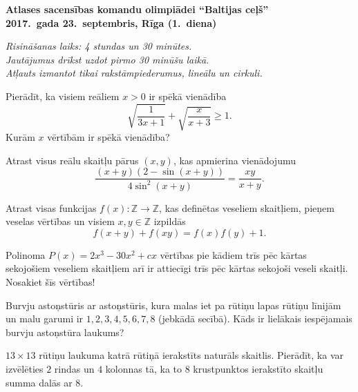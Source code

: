 \documentclass[11pt]{article}
\begin{document}
\begin{center}
{\Large \bf Atlases sacensības komandu olimpiādei ``Baltijas ceļš''}\\
{\bf 2017.\ gada 23.\ septembris, Rīga (1.\ diena)}
\end{center}

{\footnotesize \em 
Risināšanas laiks: 4 stundas un 30 minūtes.\\
Jautājumus drīkst uzdot pirmo 30 minūšu laikā.\\ 
Atļauts izmantot tikai rakstāmpiederumus, lineālu un cirkuli.
}

\begin{problem}[BW.TST.2017.1]
Pierādīt, ka visiem reāliem $x>0$ ir spēkā vienādība
\[ \sqrt{\frac{1}{3x+1}} + \sqrt{\frac{x}{x+3}} \geq 1. \]
Kurām $x$ vērtībām ir spēkā vienādība?
\end{problem}

\begin{problem}[BW.TST.2017.2]
Atrast visus reālu skaitļu pārus $(x,y)$, kas apmierina vienādojumu
\[ \frac{(x+y)(2 - \sin(x+y))}{4 \sin^2(x+y)} = \frac{xy}{x+y}. \]
\end{problem}

\begin{problem}[BW.TST.2017.3]
Atrast visas funkcijas $f(x): \mathbb{Z} \rightarrow \mathbb{Z}$, kas
definētas veseliem skaitļiem, pieņem veselas vērtības un visiem 
$x,y \in \mathbb{Z}$ izpildās
\[ f(x+y) + f(xy) = f(x)f(y) + 1. \]
\end{problem}

\begin{problem}[BW.TST.2017.4]
Polinoma $P(x) = 2x^3 - 30x^2 + cx$ vērtības pie kādiem trīs pēc kārtas 
sekojošiem veseliem skaitļiem arī ir attiecīgi trīs pēc kārtas sekojoši veseli skaitļi. 
Nosakiet šīs vērtības!
\end{problem}


\begin{problem}[BW.TST.2017.5]
Burvju astoņstūris ar astoņstūris, kura malas iet pa rūtiņu lapas rūtiņu 
līnijām un malu garumi ir $1,2,3,4,5,6,7,8$ (jebkādā secībā). 
Kāds ir lielākais iespējamais burvju astoņstūra laukums?
\end{problem}

\begin{problem}[BW.TST.2017.6]
$13 \times 13$ rūtiņu laukuma katrā rūtiņā ierakstīts naturāls skaitlis. 
Pierādīt, ka var izvēlēties $2$ rindas un $4$ kolonnas tā, ka to $8$ krustpunktos 
ierakstīto skaitļu summa dalās ar $8$.  
\end{problem}
\end{document}
